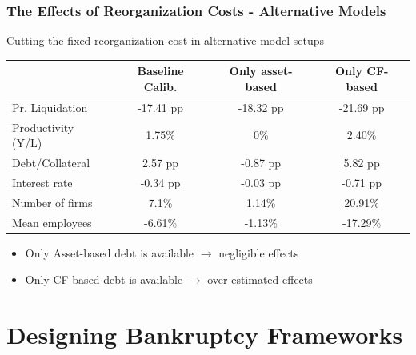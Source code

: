 \documentclass[aspectratio=169,xcolor=table]{beamer}
\begin{document}
\begin{frame}[label=Aggeffects] \frametitle{The Effects of Reorganization Costs - Alternative Models \hfill  \hyperlink{liqrisk}{}}

Cutting the fixed reorganization cost in alternative model setups

\footnotesize
\begin{table}[H]
    \centering
    \renewcommand{\arraystretch}{0.85}
    \begin{tabular}{lccc}
    & \textbf{Baseline Calib.} & \textbf{Only asset-based} & \textbf{Only CF-based} \\    
    \toprule
    \rowcolor{blue!10} Pr. Liquidation & -17.41 pp & -18.32 pp & -21.69 pp \\  
    \rowcolor{blue!10} Productivity (Y/L) & 1.75\% & 0\% & 2.40\% \vspace{2mm} \\  

    Debt/Collateral & 2.57 pp & -0.87 pp & 5.82 pp \\  
    Interest rate & -0.34 pp & -0.03 pp & -0.71 pp \\  
    Number of firms & 7.1\% & 1.14\% & 20.91\% \\  
    Mean employees & -6.61\% & -1.13\% & -17.29\% \\  
    \bottomrule
    \end{tabular}
    \label{tab:percentage_changes}
\end{table}
\normalsize

\small
\begin{itemize} 
    \item Only Asset-based debt is available $\rightarrow$ negligible effects
    \item Only CF-based debt is available $\rightarrow$ over-estimated effects
\end{itemize} 


\end{frame}


\section{Designing Bankruptcy Frameworks}
\end{document}
